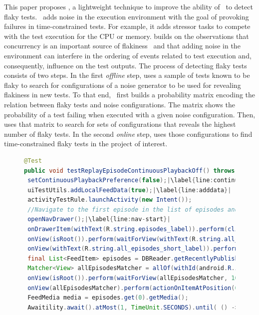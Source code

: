 \documentclass[conference]{IEEEtran}
\begin{document}
This paper proposes \tname, a lightweight technique to improve the ability of \rerun\ to detect flaky tests.
\tname\ adds noise in the execution environment with the goal of provoking failures in time-constrained tests.  For example, it adds stressor tasks to compete with the test execution for the CPU or memory. \tname{} builds on the observations that concurrency is an important source of flakiness~\cite{Luo:2014:EAF:2635868.2635920,dong2020concurrencyrelated} and that adding noise in the environment can interfere in the ordering of events related to test execution and, consequently, influence on the test outputs. The process of detecting flaky tests consists of two steps. In the first \emph{offline} step, \tname{} uses a sample of tests known to be flaky to search for configurations of a noise generator to be used for revealing flakiness in new tests. To that end, \tname\ first builds a probability matrix encoding the relation between flaky tests and noise configurations. The matrix shows the probability of a test failing when executed with a given noise configuration. Then, \tname{} uses that matrix to search for sets of configurations that reveals the highest number of flaky tests. In the second \emph{online} step, \tname{} uses those configurations to find time-constrained flaky tests in the project of interest.

\begin{figure}[t!]
\begin{lstlisting}[language=Java, caption=AntennaPod Test,label=AntennaPodTest, escapechar=|, keywords={@Test, perform, await}]
@Test
public void testReplayEpisodeContinuousPlaybackOff() throws Exception {
 setContinuousPlaybackPreference(false);|\label{line:continuousplayback}|
 uiTestUtils.addLocalFeedData(true);|\label{line:adddata}|
 activityTestRule.launchActivity(new Intent());
 //Navigate to the first episode in the list of episodes and click
 openNavDrawer();|\label{line:nav-start}|
 onDrawerItem(withText(R.string.episodes_label)).perform(click());
 onView(isRoot()).perform(waitForView(withText(R.string.all_episodes_short_label), 1000));
 onView(withText(R.string.all_episodes_short_label)).perform(click());
 final List<FeedItem> episodes = DBReader.getRecentlyPublishedEpisodes(0, 10);
 Matcher<View> allEpisodesMatcher = allOf(withId(android.R.id.list), isDisplayed(), hasMinimumChildCount(2));
 onView(isRoot()).perform(waitForView(allEpisodesMatcher, 1000));
 onView(allEpisodesMatcher).perform(actionOnItemAtPosition(0, clickChildViewWithId(R.id.secondaryActionButton)));|\label{line:nav-finish}|
 FeedMedia media = episodes.get(0).getMedia();
 Awaitility.await().atMost(1, TimeUnit.SECONDS).until( () -> media.getId() == PlaybackPreferences.getCurrentlyPlayingFeedMediaId());|\label{line:awitibility}| ... }
\end{lstlisting}
\end{figure}
\end{document}
